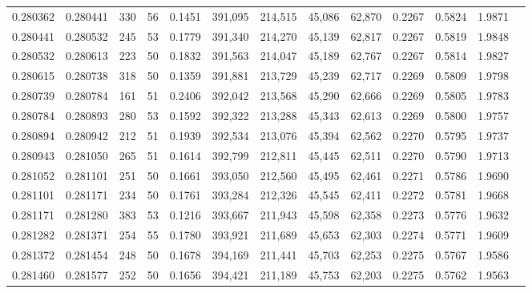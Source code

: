 \begin{tabular}{rrrrrrrrrrrrr}
0.280362 & 0.280441 &   330 &  56 &                                     0.1451 & 391,095 & 214,515 &  45,086 &  62,870 & 0.2267 & 0.5824 & 1.9871 \\
0.280441 & 0.280532 &   245 &  53 &                                     0.1779 & 391,340 & 214,270 &  45,139 &  62,817 & 0.2267 & 0.5819 & 1.9848 \\
0.280532 & 0.280613 &   223 &  50 &                                     0.1832 & 391,563 & 214,047 &  45,189 &  62,767 & 0.2267 & 0.5814 & 1.9827 \\
0.280615 & 0.280738 &   318 &  50 &                                     0.1359 & 391,881 & 213,729 &  45,239 &  62,717 & 0.2269 & 0.5809 & 1.9798 \\
0.280739 & 0.280784 &   161 &  51 &                                     0.2406 & 392,042 & 213,568 &  45,290 &  62,666 & 0.2269 & 0.5805 & 1.9783 \\
0.280784 & 0.280893 &   280 &  53 &                                     0.1592 & 392,322 & 213,288 &  45,343 &  62,613 & 0.2269 & 0.5800 & 1.9757 \\
0.280894 & 0.280942 &   212 &  51 &                                     0.1939 & 392,534 & 213,076 &  45,394 &  62,562 & 0.2270 & 0.5795 & 1.9737 \\
0.280943 & 0.281050 &   265 &  51 &                                     0.1614 & 392,799 & 212,811 &  45,445 &  62,511 & 0.2270 & 0.5790 & 1.9713 \\
0.281052 & 0.281101 &   251 &  50 &                                     0.1661 & 393,050 & 212,560 &  45,495 &  62,461 & 0.2271 & 0.5786 & 1.9690 \\
0.281101 & 0.281171 &   234 &  50 &                                     0.1761 & 393,284 & 212,326 &  45,545 &  62,411 & 0.2272 & 0.5781 & 1.9668 \\
0.281171 & 0.281280 &   383 &  53 &                                     0.1216 & 393,667 & 211,943 &  45,598 &  62,358 & 0.2273 & 0.5776 & 1.9632 \\
0.281282 & 0.281371 &   254 &  55 &                                     0.1780 & 393,921 & 211,689 &  45,653 &  62,303 & 0.2274 & 0.5771 & 1.9609 \\
0.281372 & 0.281454 &   248 &  50 &                                     0.1678 & 394,169 & 211,441 &  45,703 &  62,253 & 0.2275 & 0.5767 & 1.9586 \\
0.281460 & 0.281577 &   252 &  50 &                                     0.1656 & 394,421 & 211,189 &  45,753 &  62,203 & 0.2275 & 0.5762 & 1.9563 \\

\end{tabular}
